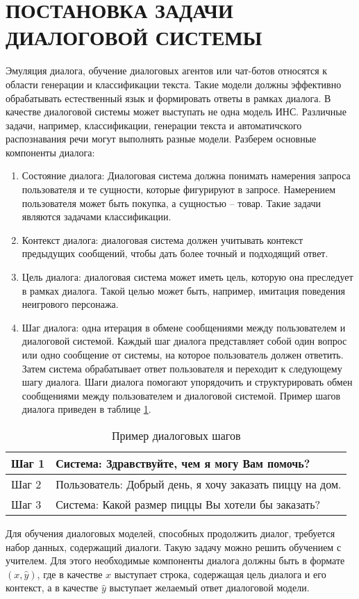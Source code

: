 \section{ПОСТАНОВКА ЗАДАЧИ ДИАЛОГОВОЙ СИСТЕМЫ}
Эмуляция диалога, обучение диалоговых агентов или чат-ботов относятся к области генерации и классификации текста. Такие модели должны эффективно обрабатывать естественный язык и формировать ответы в рамках диалога. В качестве диалоговой системы может выступать не одна модель ИНС. Различные задачи, например, классификации, генерации текста и автоматичского распознавания речи могут выполнять разные модели. Разберем основные компоненты диалога:

\begin{enumerate}
    \item Состояние диалога: Диалоговая система должна понимать намерения запроса пользователя и те сущности, которые фигурируют в запросе. Намерением пользователя может быть покупка, а сущностью -- товар. Такие задачи являются задачами классификации.
    \item Контекст диалога: диалоговая система должен учитывать контекст предыдущих сообщений, чтобы дать более точный и подходящий ответ.
    \item Цель диалога: диалоговая система может иметь цель, которую она преследует в рамках диалога. Такой целью может быть, например, имитация поведения неигрового персонажа.
    \item Шаг диалога: одна итерация в обмене сообщениями между пользователем и диалоговой системой. Каждый шаг диалога представляет собой один вопрос или одно сообщение от системы, на которое пользователь должен ответить. Затем система обрабатывает ответ пользователя и переходит к следующему шагу диалога. Шаги диалога помогают упорядочить и структурировать обмен сообщениями между пользователем и диалоговой системой. Пример шагов диалога приведен в таблице \ref{tab:dialogue-turn}.
\end{enumerate}

\begin{table}[H]
    \captionsetup{format=hang, singlelinecheck=false}
    \raggedleft
    \caption{Пример диалоговых шагов}
    \label{tab:dialogue-turn}
    \centering
    \begin{tabular}{|p{5cm}|p{10cm}|}
        \hline
        Шаг 1 & Система: Здравствуйте, чем я могу Вам помочь?            \\
        \hline
        Шаг 2 & Пользователь: Добрый день, я хочу заказать пиццу на дом. \\
        \hline
        Шаг 3 & Система: Какой размер пиццы Вы хотели бы заказать?       \\
        \hline
    \end{tabular}
\end{table}

Для обучения диалоговых моделей, способных продолжить диалог, требуется набор данных, содержащий диалоги. Такую задачу можно решить обучением с учителем. Для этого необходимые компоненты диалога должны быть в формате $(x, \hat y)$, где в качестве $x$ выступает строка, содержащая цель диалога и его контекст, а в качестве $\hat y$ выступает желаемый ответ диалоговой модели.